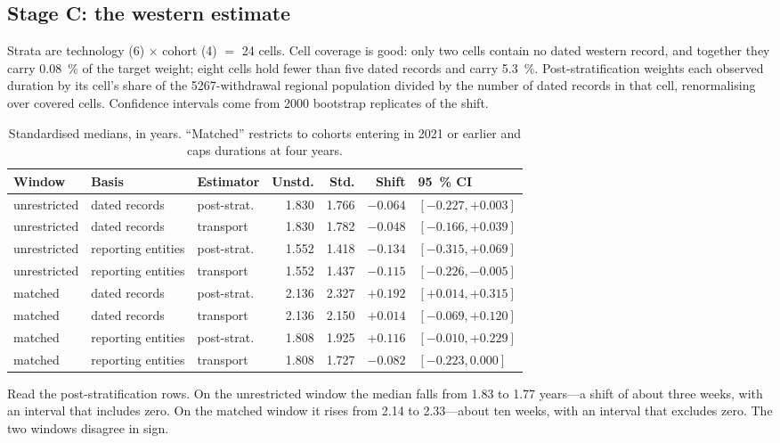 \documentclass[11pt,a4paper]{article}
\begin{document}
\subsection{Stage C: the western estimate}

Strata are technology (6) $\times$ cohort (4) $=$ 24 cells. Cell coverage is
good: only two cells contain no dated western record, and together they carry
\SI{0.08}{\percent} of the target weight; eight cells hold fewer than five dated
records and carry \SI{5.3}{\percent}. Post-stratification weights each observed
duration by its cell's share of the \num{5267}-withdrawal regional population
divided by the number of dated records in that cell, renormalising over covered
cells. Confidence intervals come from \num{2000} bootstrap replicates of the
shift.

\begin{table}[htbp]
\centering
\small
\caption{Standardised medians, in years. ``Matched'' restricts to cohorts
entering in 2021 or earlier and caps durations at four years.}
\begin{tabular}{lllrrrl}
\toprule
Window & Basis & Estimator & Unstd. & Std. & Shift & \SI{95}{\percent} CI \\
\midrule
unrestricted & dated records      & post-strat. & 1.830 & 1.766 & $\mathbf{-0.064}$ & $[-0.227, +0.003]$ \\
unrestricted & dated records      & transport   & 1.830 & 1.782 & $-0.048$ & $[-0.166, +0.039]$ \\
unrestricted & reporting entities & post-strat. & 1.552 & 1.418 & $\mathbf{-0.134}$ & $[-0.315, +0.069]$ \\
unrestricted & reporting entities & transport   & 1.552 & 1.437 & $-0.115$ & $[-0.226, -0.005]$ \\
\midrule
matched & dated records      & post-strat. & 2.136 & 2.327 & $\mathbf{+0.192}$ & $[+0.014, +0.315]$ \\
matched & dated records      & transport   & 2.136 & 2.150 & $+0.014$ & $[-0.069, +0.120]$ \\
matched & reporting entities & post-strat. & 1.808 & 1.925 & $\mathbf{+0.116}$ & $[-0.010, +0.229]$ \\
matched & reporting entities & transport   & 1.808 & 1.727 & $-0.082$ & $[-0.223, 0.000]$ \\
\bottomrule
\end{tabular}
\end{table}

Read the post-stratification rows. On the unrestricted window the median falls
from 1.83 to 1.77 years---a shift of about three weeks, with an interval that
includes zero. On the matched window it rises from 2.14 to 2.33---about ten
weeks, with an interval that excludes zero. The two windows disagree in sign.
\end{document}
